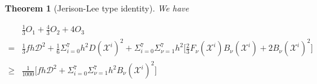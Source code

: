 \documentclass[10pt,a4paper]{amsart}
\numberwithin{equation}{section}
\newtheorem{theorem}{Theorem}[section]
\begin{document}
\begin{theorem}[Jerison-Lee type identity]We have

 

  \begin{equation}\label{jl}
     \begin{aligned}
        &\frac{1}{3}O_1+\frac{4}{3}O_2+4O_3\\=& \frac{1}{3}fh\mathcal{D}^2+\frac{1}{6}\Sigma_{i=0}^7h^2 D(\mathscr{X}^i)^2+
        \Sigma_{i=0}^7\Sigma_{\nu=1}^7h^2\bigg[\frac{2}{3}F_\nu(\mathscr{X}^i)B_\nu (\mathscr{X}^i)+2 B_\nu(\mathscr{X}^i)^2\bigg]\\\geq & \frac{1}{1000}\bigg[fh\mathcal{D}^2+\Sigma_{i=0}^7\Sigma_{\nu=1}^7h^2B_\nu (\mathscr{X}^i)^2\bigg]
     \end{aligned}
 \end{equation}\end{theorem}
\end{document}
